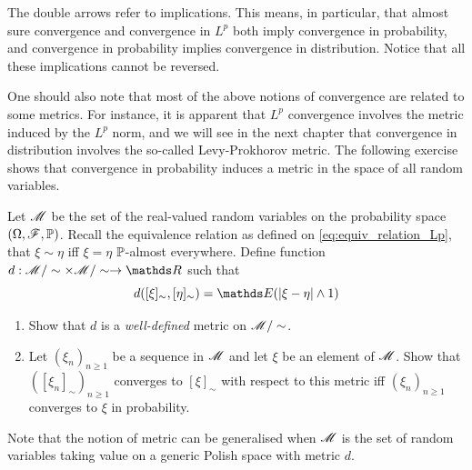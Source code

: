 

The double arrows refer to implications. This means, in particular, that almost sure convergence and convergence in $L^p$ both imply convergence in probability, and convergence in probability implies convergence in distribution. Notice that all these implications cannot be reversed.\\

\begin{unexaminable}
One should also note that most of the above notions of convergence are related to some metrics. For instance, it is apparent that $L^p$ convergence involves the metric induced by the $L^p$ norm, and we will see in the next chapter that convergence in distribution involves the so-called Levy-Prokhorov metric. The following exercise shows that convergence in probability induces a metric in the space of all random variables.

\begin{exercise} \label{ex:metric_for_conv_in_prob}
Let $\mathcal{M}$ be the set of the real-valued random variables on the probability space $(\Omega,\mathcal{F},\mathbb{P})$. Recall the equivalence relation as defined on \eqref{eq:equiv_relation_Lp}, that $\xi\sim \eta$ iff $\xi=\eta$ $\mathbb{P}$-almost everywhere. Define function $d:\M/\sim \times \M/\sim \to \R$ such that
\begin{equation}
    d([\xi]_\sim, [\eta]_\sim) = \E(|\xi-\eta| \wedge 1)
\end{equation}
\begin{enumerate}
    \item Show that $d$ is a \textit{well-defined} metric on $\mathcal{M}/\sim$.
    \item Let $(\xi_n)_{n\geq 1}$ be a sequence in $\mathcal{M}$ and let $\xi$ be an element of $\mathcal{M}$. Show that $([\xi_n]_\sim)_{n\geq 1}$ converges to $[\xi]_\sim$ with respect to this metric iff $(\xi_n)_{n\geq 1}$ converges to $\xi$ in probability.
\end{enumerate}
Note that the notion of metric can be generalised when $\mathcal{M}$ is the set of random variables taking value on a generic Polish space with metric $d$.
\end{exercise}
\end{unexaminable}
\newpage